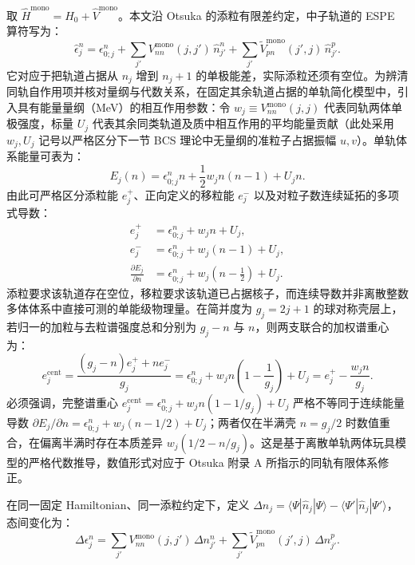 取 $\hat{H}^{\mathrm{mono}}=\hat{H}_0+\hat{V}^{\mathrm{mono}}$。本文沿 Otsuka 的添粒有限差约定，中子轨道的 ESPE 算符写为：
\begin{equation}\label{eq:2-2-9}
\hat{\epsilon}^n_j = \epsilon^n_{0; j} + \sum_{j'} V^{\mathrm{mono}}_{nn}(j, j') \, \hat{n}^n_{j'} + \sum_{j'} \tilde{V}^{\mathrm{mono}}_{pn}(j', j) \, \hat{n}^p_{j'}.
\end{equation}
它对应于把轨道占据从 $n_j$ 增到 $n_j+1$ 的单极能差，实际添粒还须有空位。为辨清同轨自作用项并核对量纲与代数关系，在固定其余轨道占据的单轨简化模型中，引入具有能量量纲（MeV）的相互作用参数：令 $w_j \equiv V^{\mathrm{mono}}_{nn}(j,j)$ 代表同轨两体单极强度，标量 $U_j$ 代表其余同类轨道及质中相互作用的平均能量贡献（此处采用 $w_j, U_j$ 记号以严格区分下一节 BCS 理论中无量纲的准粒子占据振幅 $u, v$）。单轨体系能量可表为：
\begin{equation}\label{eq:2-2-10}
E_j(n) = \epsilon^n_{0;j} n + \frac{1}{2} w_j n(n-1) + U_j n.
\end{equation}
由此可严格区分添粒能 $e_j^+$、正向定义的移粒能 $e_j^-$ 以及对粒子数连续延拓的多项式导数：
\begin{equation}\label{eq:2-2-11}
\begin{aligned}
e_j^+ &= \epsilon^n_{0;j} + w_j n + U_j,\\
e_j^- &= \epsilon^n_{0;j} + w_j(n-1) + U_j,\\
\frac{\partial E_j}{\partial n} &= \epsilon^n_{0;j} + w_j\left(n - \frac{1}{2}\right) + U_j.
\end{aligned}
\end{equation}
添粒要求该轨道存在空位，移粒要求该轨道已占据核子，而连续导数并非离散整数多体体系中直接可测的单能级物理量。在简并度为 $g_j = 2j+1$ 的球对称壳层上，若归一的加粒与去粒谱强度总和分别为 $g_j - n$ 与 $n$，则两支联合的加权谱重心为：
\begin{equation}\label{eq:2-2-12}
e_j^{\mathrm{cent}} = \frac{(g_j - n) e_j^+ + n e_j^-}{g_j} = \epsilon^n_{0;j} + w_j n \left(1 - \frac{1}{g_j}\right) + U_j = e_j^+ - \frac{w_j n}{g_j}.
\end{equation}
必须强调，完整谱重心 $e_j^{\mathrm{cent}} = \epsilon^n_{0;j} + w_j n (1 - 1/g_j) + U_j$ 严格不等同于连续能量导数 $\partial E_j/\partial n = \epsilon^n_{0;j} + w_j(n - 1/2) + U_j$；两者仅在半满壳 $n = g_j/2$ 时数值重合，在偏离半满时存在本质差异 $w_j (1/2 - n/g_j)$。这是基于离散单轨两体玩具模型的严格代数推导，数值形式对应于 Otsuka 附录 A 所指示的同轨有限体系修正。

在同一固定 Hamiltonian、同一添粒约定下，定义 $\Delta n_j=\langle\Psi|\hat n_j|\Psi\rangle-\langle\Psi'|\hat n_j|\Psi'\rangle$，态间变化为：
\begin{equation}\label{eq:2-2-13}
\Delta \epsilon^n_j = \sum_{j'} V^{\mathrm{mono}}_{nn}(j, j') \, \Delta n^n_{j'} + \sum_{j'} \tilde{V}^{\mathrm{mono}}_{pn}(j', j) \, \Delta n^p_{j'}.
\end{equation}

